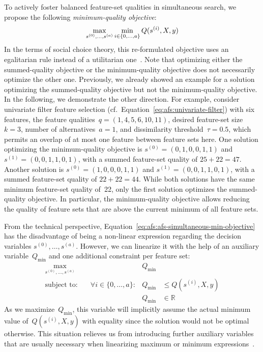 \documentclass{article}
\theoremstyle{definition}
\begin{document}
To actively foster balanced feature-set qualities in simultaneous search, we propose the following \emph{minimum-quality objective}:
%
\begin{equation}
	\max_{s^{(0)}, \dots, s^{(a)}} \min_{i \in \{0, \dots, a\}} Q(s^{(i)},X,y) \\
	\label{eq:afs:afs-simultaneous-min-objective}
\end{equation}
%
In the terms of social choice theory, this re-formulated objective uses an egalitarian rule instead of a utilitarian one~\cite{myerson1981utilitarianism}.
Note that optimizing either the summed-quality objective or the minimum-quality objective does not necessarily optimize the other one.
Previously, we already showed an example for a solution optimizing the summed-quality objective but not the minimum-quality objective.
In the following, we demonstrate the other direction.
For example, consider univariate filter feature selection (cf.~Equation~\ref{eq:afs:univariate-filter}) with six features, the feature qualities~$q = (1,4,5,6,10,11)$, desired feature-set size~$k=3$, number of alternatives~$a=1$, and dissimilarity threshold~$\tau = 0.5$, which permits an overlap of at most one feature between feature sets here.
One solution optimizing the minimum-quality objective is $s^{(0)} = (0,1,0,0,1,1)$ and $s^{(1)} = (0,0,1,1,0,1)$, with a summed feature-set quality of $25+22=47$.
Another solution is $s^{(0)} = (1,0,0,0,1,1)$ and $s^{(1)} = (0,0,1,1,0,1)$, with a summed feature-set quality of $22+22=44$.
While both solutions have the same minimum feature-set quality of~22, only the first solution optimizes the summed-quality objective.
In particular, the minimum-quality objective allows reducing the quality of feature sets that are above the current minimum of all feature sets.

From the technical perspective, Equation~\ref{eq:afs:afs-simultaneous-min-objective} has the disadvantage of being a non-linear expression regarding the decision variables $s^{(0)}, \dots, s^{(a)}$.
However, we can linearize it with the help of an auxiliary variable~$Q_{\text{min}}$ and one additional constraint per feature set:
%
\begin{equation}
	\begin{aligned}
		\max_{s^{(0)}, \dots, s^{(a)}} &\quad &Q_{\text{min}} & \\
		\text{subject to:} &\quad \forall i \in \{0, \dots, a\}: &Q_{\text{min}} &\leq Q(s^{(i)},X,y) \\
		&\quad & Q_{\text{min}} &\in \mathbb{R}
	\end{aligned}
	\label{eq:afs:afs-simultaneous-min-objective-linear}
\end{equation}
%
As we maximize~$Q_{\text{min}}$, this variable will implicitly assume the actual minimum value of~$Q(s^{(i)},X,y)$ with equality since the solution would not be optimal otherwise.
This situation relieves us from introducing further auxiliary variables that are usually necessary when linearizing maximum or minimum expressions~\cite{mosek2022modeling}.
\end{document}

